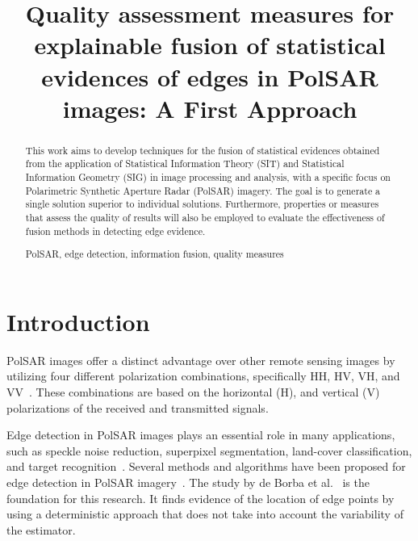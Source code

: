 \documentclass{article}
\title{Quality assessment measures for explainable fusion of statistical evidences of edges in PolSAR images: A First Approach}
\begin{document}
%
\maketitle
%
\maketitle
\vspace{-0.4cm}
\begin{abstract}
This work aims to develop techniques for the fusion of statistical evidences obtained from the application of Statistical Information Theory (SIT) and Statistical Information Geometry (SIG) in image processing and analysis, with a specific focus on Polarimetric Synthetic Aperture Radar (PolSAR) imagery. The goal is to generate a single solution superior to individual solutions. Furthermore, properties or measures that assess the quality of results will also be employed to evaluate the effectiveness of fusion methods in detecting edge evidence.

%
\begin{keywords}
PolSAR, edge detection,  information fusion,  quality
measures 
\end{keywords}
%
\end{abstract}
\vspace{-0.3cm}
\section{Introduction}
\vspace{-0.2cm}
PolSAR images offer a distinct advantage over other remote sensing images by utilizing four different polarization combinations, specifically HH, HV, VH, and VV~\cite{Hua2022}. These combinations are based on the horizontal (H), and vertical (V) polarizations of the received and transmitted signals.

Edge detection in PolSAR images plays an essential role in many applications, such as speckle noise reduction, superpixel segmentation, land-cover classification, and target recognition~\cite{Jin2016}. 
Several methods and algorithms have been proposed for edge detection in PolSAR imagery~\cite{Gambini2007,Nascimento2014}. 
The study by de Borba et al.~\cite{DeBorba2020} is the foundation for this research. 
It finds evidence of the location of edge points by using a deterministic approach that does not take into account the variability of the estimator. 
\end{document}
